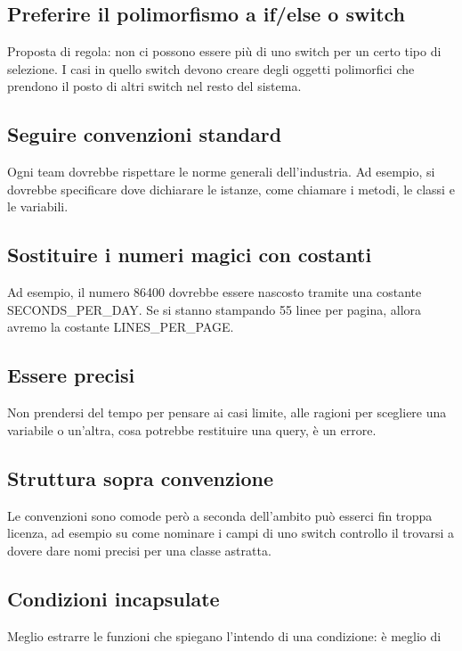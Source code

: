 \documentclass[11pt,a4paper]{book}
\begin{document}
\subsection{Preferire il polimorfismo a if/else o switch}
Proposta di regola: non ci possono essere più di uno switch per un certo tipo di selezione. I casi in quello switch devono creare degli oggetti polimorfici che prendono il posto di altri switch nel resto del sistema.

\subsection{Seguire convenzioni standard}
Ogni team dovrebbe rispettare le norme generali dell'industria. Ad esempio, si dovrebbe specificare dove dichiarare le istanze, come chiamare i metodi, le classi e le variabili.

\subsection{Sostituire i numeri magici con costanti}
Ad esempio, il numero 86400 dovrebbe essere nascosto tramite una costante SECONDS\_PER\_DAY. Se si stanno stampando 55 linee per pagina, allora avremo la costante LINES\_PER\_PAGE.

\subsection{Essere precisi}
Non prendersi del tempo per pensare ai casi limite, alle ragioni per scegliere una variabile o un'altra, cosa potrebbe restituire una query, è un errore.

\subsection{Struttura sopra convenzione}
Le convenzioni sono comode però a seconda dell'ambito può esserci fin troppa licenza, ad esempio su come nominare i campi di uno switch controllo il trovarsi a dovere dare nomi precisi per una classe astratta.

\subsection{Condizioni incapsulate}
Meglio estrarre le funzioni che spiegano l'intendo di una condizione:
\label{code: 069}
è meglio di
\label{code: 070}
\end{document}
